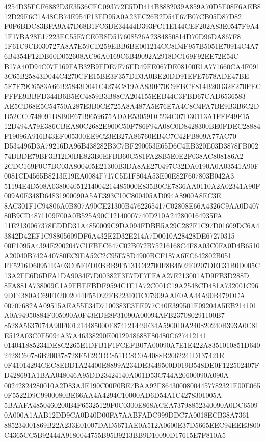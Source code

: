 \documentclass[UTF8,fontset=fandol,zihao=-4,a4paper]{ctexart}
\begin{document}
{{4254D35FCF6882D3E3536CEC093772E5DD414B8882039A859A70D5E08F6AEB812D29F6C1A48CB74E954F13ED95A0A23EC26B2D54F67B07CB05D87D82
F0F6BDC83BFA9A47D68B1FC6DE34444D393FC11E144CEF202A83E0547F9A41F17BA28E17223EC55E7CE0B8D517608526A2384850814D70D96DA867F8
1F61C9CB030727A8A7E59CD259EBB6BE001214CC8D4F957B5051E70914C4A76B4354F12DB60D052608AC96A0169C6B49092A2918DC169F92EE72E54C
B17A40D94C07F169FAB32B9FDE7F76ED49FE067DE08100E1A771660CA4F0913C65B25843D044C4270CFE15BE3F357DD3A0BE20DD91EFE7678ADE47BE
5F7F79C6583A66B25843D041C4274C819AA830F70C9FBCF814B20D32F270FECFFFE9BBFD344B6B5EC4859B3B88CA204155EEB44C3FBD67CAD6536583
AE5CD68E5C54750A287E3B0CE725A8A487A5E76E7A4C8C4FA7BE9B3B6C2DD52CC0748091D8B0E67B9659675ADAE53059DC234C07D30113A1FEF49E15
12D494A79E386CBEA80C2682E900C50F786F94A08C0D8428300BE0FDEC28884F19096A916B43EF005300EE9C23EB27A86760EB4C7C42FB809A77AC70
D534496D3A79216DA96B438282B3C7BF290053E65D6C4EB320E03D3878FB00274DBDE79BF3B12D0BE823B0EFBB60C581FA28B5E0E2F038AC808186A2
2CDC169F0C7BC03A800405E21300B3DA8AE270497C32DA0190A0A03541A90F0081CD4565B8213E19EA0084F717C5E1F804A53E00E82F607803B042A3
51194E4D508A038004051214004214485000E835B0CE7836AA0110A2A02341A90F009A0E348D64831900090A5AE393C10C800405AD094A8900A8EC3E
8AC301F1C94806A0B807A90CE21300B4762265417C02808E66A4326C9AA0D40780B9CD4871109F00A0B525A90C12140007740D210A242800164935FA
11E2130067378EDDD31A4850009C9DA094FDBB5A29C282F1C97D01609DC6A43842D42EF1C98805609DF6A432E2D32E214A7D0010A28428DE67270315
00F1095A4394E2002047C1FBEC647C02B072B75216168C4F8A03C0FA0D4B6510A20040B742A40780EC9EA52C2C95E78D4900BCF187A6EC642802B051
FF5216D60951EA03C05EFDEBBB9F5131C42700F8B4502E0207DEE31B0D005C13A2FE6D6DFA1DA9034F7D00382F3E7DF7FFAA27E213001AD9FB3D288D
8FA881A738009C1A9FBEFBDF9594C1E1A72C001C19A2548CD481A732001C969DF4380AC69EE2002044F55D92FB223E01C07909AAE0AA44A90B479DCA
00707682AA09515AEA55E34D7100383E3EE977C40E399501E09204A5EB214101A0A94950884F005090A0F43EDE8F31090A00094AFB237080291100B7
8528A5637074A90F001214485000E874121449E34A590010A240820240B393A0C81E512A03C0E5094A37A46338290E0012948688F80480C627412141
014041885234DE8C2265E1DFB1F1FCEFB07A00090A7E1E422A8351010851D6402428C60786B200378728E5E2CDC8511C8C0A4088B2062241D137421E
0F41014294CEC8EBD1A24400E8899A234DE3449500D019B548DE0F122502407FD428691A1BAA048046A95DD23424140A001D53C744A20600090A090A
00242824280010A2D83A3E190C00F0BE7BAA92F86430008004457782321E00E0650F5522D9C9900080BE66AA4A4294C10000AD6D54A1C4278301005A
5BAAFA4850460200B4F65325129F0C0300E868ACEA73798852340090A0DC65090A000A1AAB12DD9CA0D40D00FA7AABFADC999DDC7A0018ECB38A7361
885234001869B22A233E01007DAD5671AE0A512A0600E37D5665EEC94EEE3800C4365CC5B92444A9180044755B95B9213BB9D10090D17615E7F810A5
}}
\end{document}
